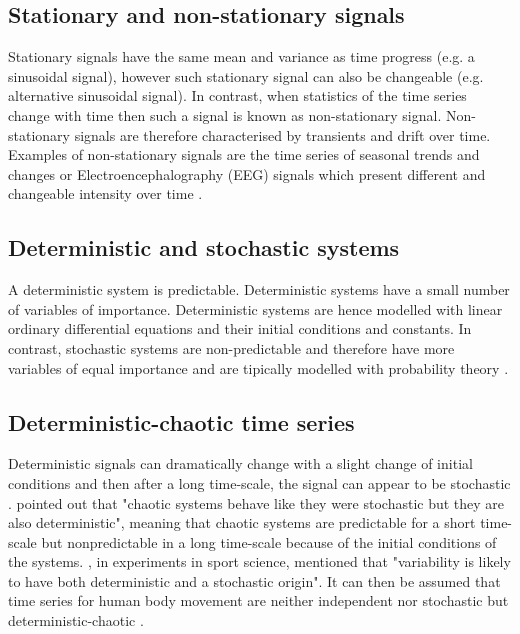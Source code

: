 \subsection{Stationary and non-stationary signals}
Stationary signals have the same mean and variance as time progress (e.g. 
a sinusoidal signal), however such stationary signal can also be changeable
(e.g. alternative sinusoidal signal).
In contrast, when statistics of the time series change with time then 
such a signal is known as non-stationary signal.
Non-stationary signals are therefore characterised by transients and 
drift over time. Examples of non-stationary signals are the time series of 
seasonal trends and changes \citep{kitagawa1984} or Electroencephalography (EEG) 
signals which present different and changeable intensity over time 
\citep{klonowski2007}.

\subsection{Deterministic and stochastic systems}
A deterministic system is predictable. Deterministic systems 
have a small number of variables of importance. 
Deterministic systems are hence modelled with linear ordinary 
differential equations and their initial conditions and constants.
In contrast, stochastic systems are non-predictable and therefore have 
more variables of equal importance and are tipically  
modelled with probability theory \citep{klonowski2007}.

\subsection{Deterministic-chaotic time series}
Deterministic signals can dramatically change with a slight change 
of initial conditions and then after a long time-scale, the signal can 
appear to be stochastic \citep{amato1992}.
\citealt[p. 11]{klonowski2007} pointed out that "chaotic systems behave 
like they were stochastic but they are also deterministic", meaning that 
chaotic systems are predictable for a short time-scale but nonpredictable 
in a long time-scale because of the initial conditions of the systems. 
\citealt[p. 78]{preatoni2013}, in experiments in sport science, mentioned 
that "variability is likely to have both deterministic and a 
stochastic origin". It can then be assumed that time series for 
human body movement are neither independent nor stochastic but 
deterministic-chaotic \citep{stergiou2006, harbourne2009, stergiou2011}.

